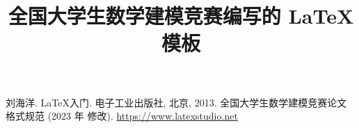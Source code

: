 \documentclass[withoutpreface,bwprint]{cumcmthesis} %
\title{全国大学生数学建模竞赛编写的 \LaTeX{} 模板}
\begin{document}
\maketitle
\begin{abstract}%

\end{abstract}












\begin{thebibliography}{9}%
    刘海洋.
    \newblock \LaTeX {}入门\allowbreak[J].
    \newblock 电子工业出版社, 北京, 2013.
    全国大学生数学建模竞赛论文格式规范 (2023 年 修改).
     \url{https://www.latexstudio.net}
\end{thebibliography}

\begin{appendices}%

\end{appendices}
\end{document}
